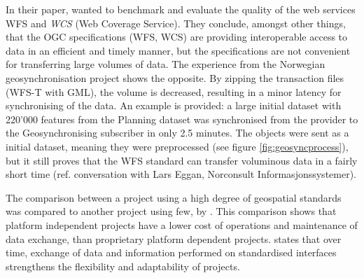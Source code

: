 
In their paper, \cite{giuliani2013} wanted to benchmark and evaluate the quality of the web services WFS and \textit{WCS} (Web Coverage Service). They conclude, amongst other things, that the OGC specifications (WFS, WCS) are providing interoperable access to data in an efficient and timely manner, but the specifications are not convenient for transferring large volumes of data.  The experience from the Norwegian geosynchronisation project shows the opposite. By zipping the transaction files (WFS-T with GML), the volume is decreased, resulting in a minor latency for synchronising of the data. An example is provided: a large initial dataset with 220'000 features from the Planning dataset was synchronised from the provider to the Geosynchronising subscriber in only 2.5 minutes. The objects were sent as a initial dataset, meaning they were preprocessed  (see figure \ref{fig:geosyncprocess}), but it still proves that the WFS standard can transfer voluminous data in a fairly short time (ref. conversation with Lars Eggan, Norconsult Informasjonssystemer).

The comparison between a project using a high degree of geospatial standards was compared to another project using few, by \cite{AllenHamilton2005}. This comparison shows that platform independent projects %
have a lower cost of operations and maintenance of data exchange, than proprietary platform dependent projects. \cite{giuliani2013} states that over time, exchange of data and information performed on standardised interfaces strengthens the flexibility and adaptability of projects.



